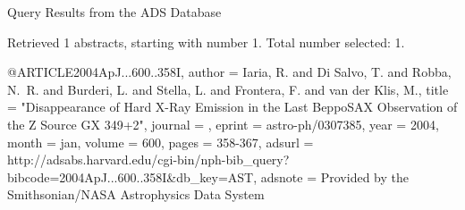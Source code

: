 Query Results from the ADS Database


Retrieved 1 abstracts, starting with number 1.  Total number selected: 1.

@ARTICLE{2004ApJ...600..358I,
   author = {{Iaria}, R. and {Di Salvo}, T. and {Robba}, N.~R. and {Burderi}, L. and 
	{Stella}, L. and {Frontera}, F. and {van der Klis}, M.},
    title = "{Disappearance of Hard X-Ray Emission in the Last BeppoSAX Observation of the Z Source GX 349+2}",
  journal = {\apj},
   eprint = {astro-ph/0307385},
     year = 2004,
    month = jan,
   volume = 600,
    pages = {358-367},
   adsurl = {http://adsabs.harvard.edu/cgi-bin/nph-bib_query?bibcode=2004ApJ...600..358I&db_key=AST},
  adsnote = {Provided by the Smithsonian/NASA Astrophysics Data System}
}


